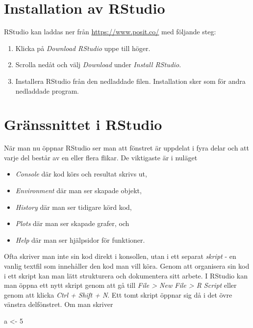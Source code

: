 \documentclass[
]{book}
\newenvironment{Shaded}{\begin{snugshade}}{\end{snugshade}}
\newcommand{\DecValTok}[1]{\textcolor[rgb]{0.00,0.00,0.81}{#1}}
\newcommand{\NormalTok}[1]{#1}
\newcommand{\OtherTok}[1]{\textcolor[rgb]{0.56,0.35,0.01}{#1}}
\providecommand{\tightlist}{%
  \setlength{\itemsep}{0pt}\setlength{\parskip}{0pt}}
\theoremstyle{definition}
\theoremstyle{definition}
\theoremstyle{definition}
\theoremstyle{definition}
\theoremstyle{remark}
\begin{document}
\section{Installation av RStudio}\label{installation-av-rstudio}

RStudio kan laddas ner från \url{https://www.posit.co/} med följande steg:

\begin{enumerate}
\def\labelenumi{\arabic{enumi}.}
\tightlist
\item
  Klicka på \emph{Download RStudio} uppe till höger.
\item
  Scrolla nedåt och välj \emph{Download} under \emph{Install RStudio}.
\item
  Installera RStudio från den nedladdade filen. Installation sker som för andra nedladdade program.
\end{enumerate}

\section{Gränssnittet i RStudio}\label{gruxe4nssnittet-i-rstudio}

När man nu öppnar RStudio ser man att fönstret är uppdelat i fyra delar och att varje del består av en eller flera flikar. De viktigaste är i nuläget

\begin{itemize}
\tightlist
\item
  \emph{Console} där kod körs och resultat skrivs ut,
\item
  \emph{Environment} där man ser skapade objekt,
\item
  \emph{History} där man ser tidigare körd kod,
\item
  \emph{Plots} där man ser skapade grafer, och
\item
  \emph{Help} där man ser hjälpsidor för funktioner.
\end{itemize}

Ofta skriver man inte sin kod direkt i konsollen, utan i ett separat \emph{skript} - en vanlig textfil som innehåller den kod man vill köra. Genom att organisera sin kod i ett skript kan man lätt strukturera och dokumentera sitt arbete. I RStudio kan man öppna ett nytt skript genom att gå till \emph{File \textgreater{} New File \textgreater{} R Script} eller genom att klicka \emph{Ctrl + Shift + N}. Ett tomt skript öppnar sig då i det övre vänstra delfönstret. Om man skriver

\begin{Shaded}
\begin{Highlighting}[]
\NormalTok{a }\OtherTok{\textless{}{-}} \DecValTok{5}
\end{Highlighting}
\end{Shaded}
\end{document}
